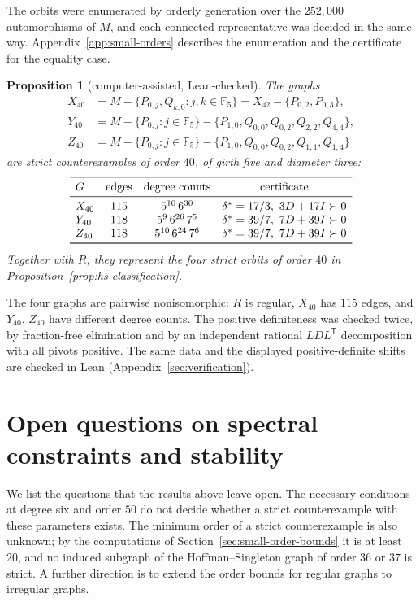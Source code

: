 \documentclass[a4paper,10pt,reqno]{amsart}
\theoremstyle{plain}
\newtheorem{proposition}[theorem]{Proposition}
\theoremstyle{definition}
\theoremstyle{remark}
\newcommand{\F}{\mathbb F_5}
\begin{document}
The orbits were enumerated by orderly generation over the \(252{,}000\)
automorphisms of \(M\), and each connected representative was decided in the
same way. Appendix~\ref{app:small-orders} describes the enumeration and the
certificate for the equality case.

\begin{proposition}[computer-assisted, Lean-checked]\label{prop:order40-irregular}
The graphs
\begin{align*}
 X_{40}&=M-\{P_{0,j},Q_{k,0}:j,k\in\F\}=X_{42}-\{P_{0,2},P_{0,3}\},\\
 Y_{40}&=M-\{P_{0,j}:j\in\F\}-\{P_{1,0},Q_{0,0},Q_{0,2},Q_{2,2},Q_{4,4}\},\\
 Z_{40}&=M-\{P_{0,j}:j\in\F\}-\{P_{1,0},Q_{0,0},Q_{0,2},Q_{1,1},Q_{1,4}\}
\end{align*}
are strict counterexamples of order \(40\), of girth five and diameter three:
\[
\begin{array}{lccc}
\toprule
G&\text{edges}&\text{degree counts}&\text{certificate}\\
\midrule
X_{40}&115&5^{10}\,6^{30}&\delta^*=17/3,\ 3D+17I\succ0\\
Y_{40}&118&5^{9}\,6^{26}\,7^{5}&\delta^*=39/7,\ 7D+39I\succ0\\
Z_{40}&118&5^{10}\,6^{24}\,7^{6}&\delta^*=39/7,\ 7D+39I\succ0\\
\bottomrule
\end{array}
\]
Together with \(R\), they represent the four strict orbits of order \(40\) in
Proposition~\ref{prop:hs-classification}.
\end{proposition}

The four graphs are pairwise nonisomorphic: \(R\) is regular, \(X_{40}\) has
\(115\) edges, and \(Y_{40}\), \(Z_{40}\) have different degree counts. The
positive definiteness was checked twice, by fraction-free elimination and by
an independent rational \(LDL^{\mathsf T}\) decomposition with all pivots
positive. The same data and the displayed positive-definite shifts are
checked in Lean (Appendix~\ref{sec:verification}).

\section{Open questions on spectral constraints and stability}\label{sec:scope}

We list the questions that the results above leave open.
The necessary conditions at degree six and order $50$ do not decide whether
a strict counterexample with these parameters exists. The minimum order of a
strict counterexample is also unknown; by the computations of
Section~\ref{sec:small-order-bounds} it is at least \(20\), and no induced subgraph
of the Hoffman--Singleton graph of order \(36\) or \(37\) is strict. A further direction is to extend the
order bounds for regular graphs to irregular graphs.
\end{document}
